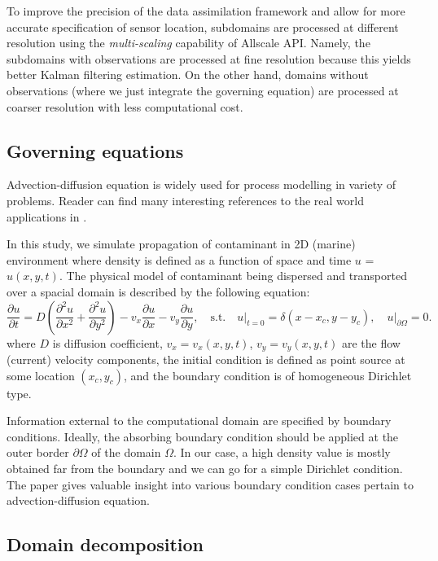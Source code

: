 \documentclass[acmsmall,review,anonymous]{acmart}\settopmatter{printfolios=true,printccs=false,printacmref=false}
\begin{document}
To improve the precision of the data assimilation framework and allow for more accurate specification of sensor location, subdomains are processed at different resolution using the \textit{multi-scaling} capability of Allscale API. Namely, the subdomains with observations are processed at fine resolution because this yields better Kalman filtering estimation. On the other hand, domains without observations (where we just integrate the governing equation) are processed at coarser resolution with less computational cost. 

\subsection{Governing equations}

Advection-diffusion equation is widely used for process modelling in variety of problems. Reader can find many interesting references to the real world applications in \cite{Miyaoka17}.

In this study, we simulate propagation of contaminant in 2D (marine) environment where density is defined as a function of space and time $u$ = $u(x,y,t)$. The physical model of contaminant being dispersed and transported over a spacial domain is described by the following equation:
\begin{equation}
\frac{\partial u}{\partial t} =
D \left(\frac{\partial^2 u}{\partial x^2} + \frac{\partial^2 u}{\partial y^2}\right)
- v_x \frac{\partial u}{\partial x}
- v_y \frac{\partial u}{\partial y},
\,\,\,\,\,\,\mbox{s.t.}\,\,\,\,\,\,
u\rvert_{t=0} = \delta(x\!-\!x_c,y\!-\!y_c),
\,\,\,\,\,\,u\rvert_{\partial\Omega}=0.
\label{eq:pde}
\end{equation}
where $D$ is diffusion coefficient, $v_x = v_x(x,y,t)$, $v_y = v_y(x,y,t)$ are the flow (current) velocity components, the initial condition is defined as point source at some location $(x_c,y_c)$, and the boundary condition is of homogeneous Dirichlet type.

Information external to the computational domain are specified by boundary conditions. Ideally, the absorbing boundary condition should be applied at the outer border $\partial\Omega$ of the domain $\Omega$. In our case, a high density value is mostly obtained far from the boundary and we can go for a simple Dirichlet condition. The paper \cite{Miyaoka17} gives valuable insight into various boundary condition cases pertain to advection-diffusion equation.


\subsection{Domain decomposition}
\end{document}
